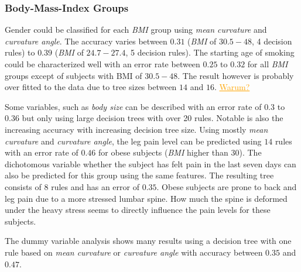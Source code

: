 \documentclass[a4paper,twoside]{style/article}
\newcommand{\com}[1]{\textcolor{orange}{\uline{#1}}}
\begin{document}
\subsubsection{Body-Mass-Index Groups}
Gender could be classified for each \emph{BMI} group using \emph{mean curvature} and \emph{curvature angle}.
The accuracy varies between $0.31$ (\emph{BMI} of \emph{$30.5-48$}, 4 decision rules) to $0.39$ (\emph{BMI} of \emph{$24.7-27.4$}, 5 decision rules).
The starting age of smoking could be characterized well with an error rate between $0.25$ to $0.32$ for all \emph{BMI} groups except of subjects with BMI of \emph{$30.5-48$}.
The result however is probably over fitted to the data due to tree sizes between $14$ and $16$.
\com{Warum?}

Some variables, such as \emph{body size} can be described with an error rate of $0.3$ to $0.36$ but only using large decision trees with over 20 rules.
Notable is also the increasing accuracy with increasing decision tree size.
Using mostly \emph{mean curvature} and \emph{curvature angle}, the leg pain level can be predicted using $14$ rules with an error rate of $0.46$ for obese subjects (\emph{BMI} higher than $30$).
The dichotomous variable whether the subject has felt pain in the last seven days can also be predicted for this group using the same features.
The resulting tree consists of $8$ rules and has an error of $0.35$.
Obese subjects are prone to back and leg pain due to a more stressed lumbar spine.
How much the spine is deformed under the heavy stress seems to directly influence the pain levels for these subjects.

The dummy variable analysis shows many results using a decision tree with one rule based on \emph{mean curvature} or \emph{curvature angle} with accuracy between $0.35$ and $0.47$.
\end{document}
